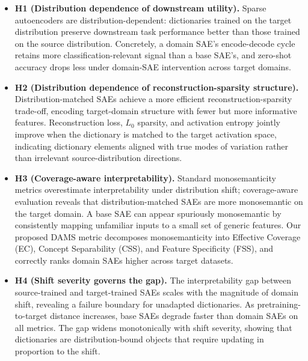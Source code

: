 \begin{itemize}
    \item \textbf{H1 (Distribution dependence of downstream utility).}
    Sparse autoencoders are distribution-dependent: dictionaries trained on
    the target distribution preserve downstream task performance better
    than those trained on the source distribution. Concretely, a domain
    SAE's encode-decode cycle retains more classification-relevant signal
    than a base SAE's, and zero-shot accuracy drops less under domain-SAE
    intervention across target domains.

    \item \textbf{H2 (Distribution dependence of reconstruction-sparsity structure).}
    Distribution-matched SAEs achieve a more efficient
    reconstruction-sparsity trade-off, encoding target-domain structure
    with fewer but more informative features. Reconstruction loss, $L_0$
    sparsity, and activation entropy jointly improve when the dictionary
    is matched to the target activation space, indicating dictionary
    elements aligned with true modes of variation rather than irrelevant
    source-distribution directions.

    \item \textbf{H3 (Coverage-aware interpretability).}
    Standard monosemanticity metrics overestimate interpretability under
    distribution shift; coverage-aware evaluation reveals that
    distribution-matched SAEs are more monosemantic on the target domain.
    A base SAE can appear spuriously monosemantic by consistently mapping
    unfamiliar inputs to a small set of generic features. Our proposed
    DAMS metric decomposes monosemanticity into Effective Coverage (EC),
    Concept Separability (CSS), and Feature Specificity (FSS), and
    correctly ranks domain SAEs higher across target datasets.

    \item \textbf{H4 (Shift severity governs the gap).}
    The interpretability gap between source-trained and target-trained
    SAEs scales with the magnitude of domain shift, revealing a failure
    boundary for unadapted dictionaries. As pretraining-to-target
    distance increases, base SAEs degrade faster than domain SAEs on all
    metrics. The gap widens monotonically with shift severity, showing
    that dictionaries are distribution-bound objects that require
    updating in proportion to the shift.
\end{itemize}

